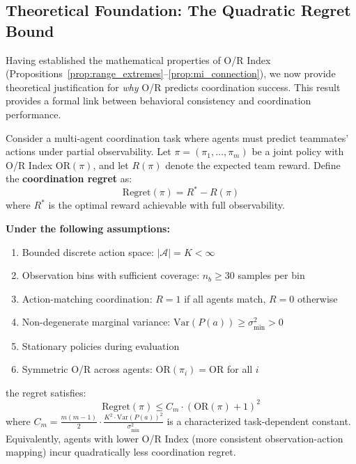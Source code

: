 
\subsection{Theoretical Foundation: The Quadratic Regret Bound}
\label{subsec:quadratic_regret}

Having established the mathematical properties of O/R Index (Propositions~\ref{prop:range_extremes}--\ref{prop:mi_connection}), we now provide theoretical justification for \textit{why} O/R predicts coordination success. This result provides a formal link between behavioral consistency and coordination performance.

\begin{proposition}
\label{prop:quadratic_regret}
Consider a multi-agent coordination task where agents must predict teammates' actions under partial observability. Let $\pi = (\pi_1, \dots, \pi_m)$ be a joint policy with O/R Index $\text{OR}(\pi)$, and let $R(\pi)$ denote the expected team reward. Define the \textbf{coordination regret} as:
\begin{equation}
\text{Regret}(\pi) = R^* - R(\pi)
\end{equation}
where $R^*$ is the optimal reward achievable with full observability.

\textbf{Under the following assumptions:}
\begin{enumerate}[label=\textbf{(A\arabic*)}]
    \item Bounded discrete action space: $|\mathcal{A}| = K < \infty$
    \item Observation bins with sufficient coverage: $n_b \geq 30$ samples per bin
    \item Action-matching coordination: $R = 1$ if all agents match, $R = 0$ otherwise
    \item Non-degenerate marginal variance: $\text{Var}(P(a)) \geq \sigma^2_{\min} > 0$
    \item Stationary policies during evaluation
    \item Symmetric O/R across agents: $\text{OR}(\pi_i) = \text{OR}$ for all $i$
\end{enumerate}

\noindent the regret satisfies:
\begin{equation}
\text{Regret}(\pi) \leq C_m \cdot (\text{OR}(\pi) + 1)^2
\end{equation}
where $C_m = \frac{m(m-1)}{2} \cdot \frac{K^2 \cdot \text{Var}(P(a))^2}{\sigma^2_{\min}}$ is a characterized task-dependent constant. Equivalently, agents with lower O/R Index (more consistent observation-action mapping) incur quadratically less coordination regret.
\end{proposition}

